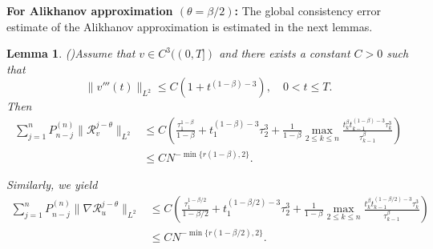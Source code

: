 \documentclass[11pt]{article}
\newtheorem{lemma}{Lemma}[section]
\numberwithin{equation}{section}
\begin{document}
\textbf{For Alikhanov approximation $(\theta=\beta/2)$:}
The global consistency error estimate of the Alikhanov approximation is estimated in the
next lemmas.
\begin{lemma}{\rm{(\cite[Lemma 3.6 and Theorem 3.9]{LiaoH2021L2_1})}}\label{lem-r-v}
    Assume that \( v \in C^3((0, T]) \) and there exists a constant \( C>0 \) such that
    \[
    \|v'''(t)\|_{L^2} \leq C (1 + t^{(1-\beta)-3}), \quad 0 < t \leq T.
    \]
    Then
 \begin{align*}
    \sum_{j=1}^n P_{n-j}^{(n)} \|\mathcal{R}_v^{j-\theta}\|_{L^2} &\leq 
    C\left( \frac{\tau_1^{1-\beta}}{1-\beta} + t_1^{(1-\beta)-3} \tau_2^3 + 
    \frac{1}{1 - \beta} \max_{2 \leq k \leq n} \frac{t_k^\beta t_{k-1}^{(1-\beta)-3} \tau_k^3}{\tau_{k-1}^\beta} \right)\\
    &\leq CN^{-\min\{r(1-\beta),2\}}.
 \end{align*}

    Similarly, we yield
 \begin{align*}    
    \sum_{j=1}^n P_{n-j}^{(n)} \|\nabla\mathcal{R}_u^{j-\theta}\|_{L^2} &\leq  C\left( \frac{\tau_1^{1-\beta/2}}{1-\beta/2} + t_1^{(1-\beta/2)-3} \tau_2^3 +  \frac{1}{1-\beta} \max_{2 \leq k \leq n} \frac{t_k^\beta t_{k-1}^{(1-\beta/2)-3} \tau_k^3}{\tau_{k-1}^\beta} \right)\\
    &\leq CN^{-\min\{r(1-\beta/2),2\}}.     
 \end{align*}
\end{lemma}
\end{document}
